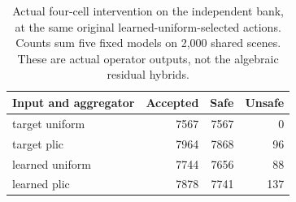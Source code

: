 \begin{table}[h]
\centering\small
\caption{Actual four-cell intervention on the independent bank, at the same original learned-uniform-selected actions. Counts sum five fixed models on 2,000 shared scenes. These are actual operator outputs, not the algebraic residual hybrids.}
\label{tab:independentcells}
\begin{tabular}{lrrr}
\toprule
Input and aggregator & Accepted & Safe & Unsafe\\
\midrule
target uniform & 7567 & 7567 & 0\\
target plic & 7964 & 7868 & 96\\
learned uniform & 7744 & 7656 & 88\\
learned plic & 7878 & 7741 & 137\\
\bottomrule
\end{tabular}
\end{table}
